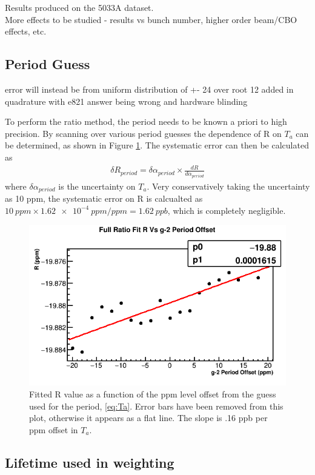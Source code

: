 	Results produced on the 5033A dataset. \\

	More effects to be studied - results vs bunch number, higher order beam/CBO effects, etc.

	\subsection{\gmtwo Period Guess}
	\label{SubSec:gm2Guess}

		error will instead be from uniform distribution of +- 24 over root 12 added in quadrature with e821 answer being wrong and hardware blinding

		To perform the ratio method, the \gmtwo period needs to be known a priori to high precision. By scanning over various \gmtwo period guesses the dependence of R on $T_{a}$ can be determined, as shown in Figure \ref{fig:gm2PeriodGuess}. The systematic error can then be calculated as 
			\begin{align}
				\delta R_{period} = \delta\alpha_{period} \times \frac{dR}{d\alpha_{period}}
			\end{align}
		where $\delta\alpha_{period}$ is the uncertainty on $T_{a}$. Very conservatively taking the uncertainty as 10 ppm, the systematic error on R is calcualted as $\SI{10}{ppm} \times \SI{1.62e-4}{ppm/ppm} = \SI{1.62}{ppb}$, which is completely negligible.

		\begin{figure}[]
			\centering
			\includegraphics[width=.6\textwidth]{RatioCBO_R_Vs_gm2PeriodGuess_Canv}
		    \caption[gm2PeriodGuess]{Fitted R value as a function of the ppm level offset from the guess used for the \gmtwo period, \ref{eq:Ta}. Error bars have been removed from this plot, otherwise it appears as a flat line. The slope is .16 ppb per ppm offset in $T_{a}$.}
		    \label{fig:gm2PeriodGuess}
		\end{figure}

	\subsection{Lifetime used in weighting}
	\label{SubSec:LifetimeWeighting}

